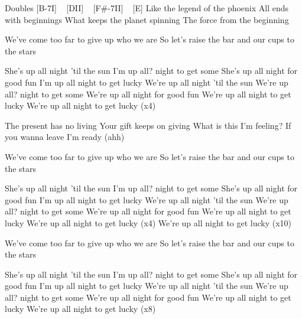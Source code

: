 \begin{guitar}
Doubles
[B-7I] ~ [DII] ~ [F#-7II] ~ [E]
Like the legend of the phoenix
All ends with beginnings
What keeps the planet spinning
The force from the beginning

We've come too far to give up who we are
So let's raise the bar and our cups to the stars

She's up all night 'til the sun
I'm up all? night to get some
She's up all night for good fun
I'm up all night to get lucky
We're up all night 'til the sun
We're up all? night to get some
We're up all night for good fun
We're up all night to get lucky
We're up all night to get lucky (x4)

The present has no living
Your gift keeps on giving
What is this I'm feeling?
If you wanna leave I'm ready (ahh)

We've come too far to give up who we are
So let's raise the bar and our cups to the stars

She's up all night 'til the sun
I'm up all? night to get some
She's up all night for good fun
I'm up all night to get lucky
We're up all night 'til the sun
We're up all? night to get some
We're up all night for good fun
We're up all night to get lucky
We're up all night to get lucky (x4)
We're up all night to get lucky (x10)

We've come too far to give up who we are
So let's raise the bar and our cups to the stars

She's up all night 'til the sun
I'm up all? night to get some
She's up all night for good fun
I'm up all night to get lucky
We're up all night 'til the sun
We're up all? night to get some
We're up all night for good fun
We're up all night to get lucky
We're up all night to get lucky (x8) 
\end{guitar}
